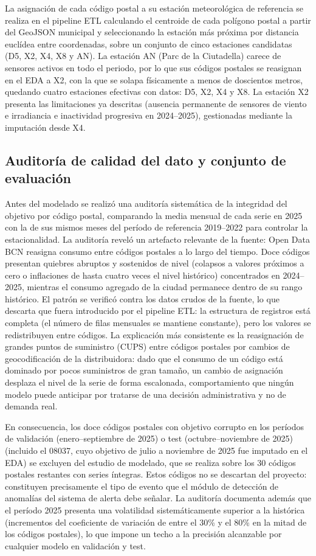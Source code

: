 \documentclass[12pt, a4paper]{article}
\begin{document}
La asignación de cada código postal a su estación meteorológica de referencia se realiza en el pipeline ETL calculando el centroide de cada polígono postal a partir del GeoJSON municipal y seleccionando la estación más próxima por distancia euclídea entre coordenadas, sobre un conjunto de cinco estaciones candidatas (D5, X2, X4, X8 y AN). La estación AN (Parc de la Ciutadella) carece de sensores activos en todo el periodo, por lo que sus códigos postales se reasignan en el EDA a X2, con la que se solapa físicamente a menos de doscientos metros, quedando cuatro estaciones efectivas con datos: D5, X2, X4 y X8. La estación X2 presenta las limitaciones ya descritas (ausencia permanente de sensores de viento e irradiancia e inactividad progresiva en 2024--2025), gestionadas mediante la imputación desde X4.

\subsection{Auditoría de calidad del dato y conjunto de evaluación}


Antes del modelado se realizó una auditoría sistemática de la integridad del objetivo por código postal, comparando la media mensual de cada serie en 2025 con la de sus mismos meses del período de referencia 2019--2022 para controlar la estacionalidad. La auditoría reveló un artefacto relevante de la fuente: Open Data BCN reasigna consumo entre códigos postales a lo largo del tiempo. Doce códigos presentan quiebres abruptos y sostenidos de nivel (colapsos a valores próximos a cero o inflaciones de hasta cuatro veces el nivel histórico) concentrados en 2024--2025, mientras el consumo agregado de la ciudad permanece dentro de su rango histórico. El patrón se verificó contra los datos crudos de la fuente, lo que descarta que fuera introducido por el pipeline ETL: la estructura de registros está completa (el número de filas mensuales se mantiene constante), pero los valores se redistribuyen entre códigos. La explicación más consistente es la reasignación de grandes puntos de suministro (CUPS) entre códigos postales por cambios de geocodificación de la distribuidora: dado que el consumo de un código está dominado por pocos suministros de gran tamaño, un cambio de asignación desplaza el nivel de la serie de forma escalonada, comportamiento que ningún modelo puede anticipar por tratarse de una decisión administrativa y no de demanda real.

En consecuencia, los doce códigos postales con objetivo corrupto en los períodos de validación (enero--septiembre de 2025) o test (octubre--noviembre de 2025) (incluido el 08037, cuyo objetivo de julio a noviembre de 2025 fue imputado en el EDA) se excluyen del estudio de modelado, que se realiza sobre los 30 códigos postales restantes con series íntegras. Estos códigos no se descartan del proyecto: constituyen precisamente el tipo de evento que el módulo de detección de anomalías del sistema de alerta debe señalar. La auditoría documenta además que el período 2025 presenta una volatilidad sistemáticamente superior a la histórica (incrementos del coeficiente de variación de entre el 30\% y el 80\% en la mitad de los códigos postales), lo que impone un techo a la precisión alcanzable por cualquier modelo en validación y test.
\end{document}

